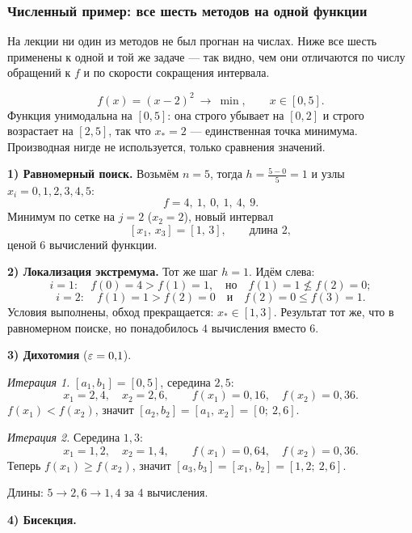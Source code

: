 \subsubsection*{Численный пример: все шесть методов на одной функции}

\begin{idea}[title={Откуда этот материал}]
На лекции ни один из методов не был прогнан на числах. Ниже все шесть
применены к одной и той же задаче — так видно, чем они отличаются по числу
обращений к $f$ и по скорости сокращения интервала.
\end{idea}

\begin{example}\label{ex:one-dim-run}
\[
  f(x) = (x-2)^2 \ \longrightarrow\ \min , \qquad x \in [0, 5] .
\]
Функция унимодальна на $[0,5]$: она строго убывает на $[0,2]$ и строго
возрастает на $[2,5]$, так что $x_* = 2$ — единственная точка минимума.
Производная нигде не используется, только сравнения значений.

\medskip
\noindent\textbf{1) Равномерный поиск.} Возьмём $n = 5$, тогда
$h = \frac{5-0}{5} = 1$ и узлы $x_i = 0,1,2,3,4,5$:
\[
  f = 4,\ 1,\ 0,\ 1,\ 4,\ 9 .
\]
Минимум по сетке на $j = 2$ ($x_2 = 2$), новый интервал
\[
  [x_1,\, x_3] = [1,\, 3] , \qquad \text{длина } 2 ,
\]
ценой $6$ вычислений функции.

\medskip
\noindent\textbf{2) Локализация экстремума.} Тот же шаг $h = 1$. Идём слева:
\[
  i = 1: \quad f(0) = 4 > f(1) = 1 , \quad\text{но}\quad f(1) = 1 \not\le f(2) = 0 ;
\]
\[
  i = 2: \quad f(1) = 1 > f(2) = 0 \quad\text{и}\quad f(2) = 0 \le f(3) = 1 .
\]
Условия выполнены, обход прекращается: $x_* \in [1, 3]$. Результат тот же, что
в равномерном поиске, но понадобилось $4$ вычисления вместо $6$.

\medskip
\noindent\textbf{3) Дихотомия} ($\varepsilon = 0{,}1$).

\emph{Итерация 1.} $[a_1,b_1] = [0,5]$, середина $2{,}5$:
\[
  x_1 = 2{,}4 , \quad x_2 = 2{,}6 ,
  \qquad f(x_1) = 0{,}16 , \quad f(x_2) = 0{,}36 .
\]
$f(x_1) < f(x_2)$, значит $[a_2,b_2] = [a_1,\, x_2] = [0;\ 2{,}6]$.

\emph{Итерация 2.} Середина $1{,}3$:
\[
  x_1 = 1{,}2 , \quad x_2 = 1{,}4 ,
  \qquad f(x_1) = 0{,}64 , \quad f(x_2) = 0{,}36 .
\]
Теперь $f(x_1) \ge f(x_2)$, значит $[a_3,b_3] = [x_1,\, b_2] = [1{,}2;\ 2{,}6]$.

Длины: $5 \to 2{,}6 \to 1{,}4$ за $4$ вычисления.

\medskip
\noindent\textbf{4) Бисекция.}


\end{example}
